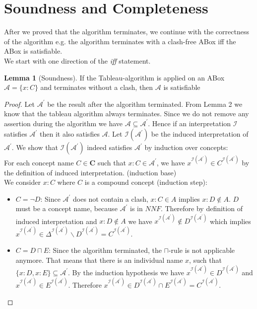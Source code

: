 \documentclass{book}
\theoremstyle{break}
\theoremstyle{definition}
\newtheorem{mylem}{Lemma}
\begin{document}
\section{Soundness and Completeness}
After we proved that the algorithm terminates, we continue with the correctness of the algorithm e.g. the algorithm terminates with a clash-free ABox iff the ABox is satisfiable.\\
We start with one direction of the \textit{iff} statement.
\begin{mylem}[Soundness]
If the Tableau-algorithm is applied on an ABox $\mathcal{A}=\{x:C\}$ and  terminates without a clash, then $\mathcal{A}$ is satisfiable
\end{mylem}
\begin{proof}
Let $\mathcal{A}^\prime$ be the result after the algorithm terminated. From Lemma 2 we know that the tableau algorithm always terminates. Since we do not remove any assertion during the algorithm we have $\mathcal{A}\subseteq\mathcal{A}^\prime$. Hence if an interpretation $\mathcal{I}$ satisfies $\mathcal{A}^\prime$ then it also satisfies $\mathcal{A}$. Let $\mathcal{I}(\mathcal{A}^\prime)$ be the induced interpretation of $\mathcal{A}^\prime$. We show that $\mathcal{I}(\mathcal{A}^\prime)$ indeed satisfies $\mathcal{A}^\prime$ by induction over concepts:\\
For each concept name $C\in\mathbf{C}$ such that $x:C\in\mathcal{A}^\prime$, we have $x^{\mathcal{I}(\mathcal{A}^\prime)}\in C^{\mathcal{I}(\mathcal{A}^\prime)}$ by the definition of induced interpretation. (induction base)\\
We consider $x:C$ where $C$ is a compound concept (induction step):
\begin{itemize}
\item $C=\neg D$: Since $\mathcal{A}^\prime$ does not contain a clash, $x:C\in A$ implies $x:D\notin A$. $D$ must be a concept name, because $\mathcal{A}^\prime$ is in $NNF$. Therefore by definition of induced interpretation and $x:D\notin A$ we have $x^{\mathcal{I}(\mathcal{A}^\prime)}\notin D^{\mathcal{I}(\mathcal{A}^\prime)}$ which implies $x^{\mathcal{I}(\mathcal{A}^\prime)}\in \Delta^{\mathcal{I}(\mathcal{A}^\prime)}\backslash D^{\mathcal{I}(\mathcal{A}^\prime)}=C^{\mathcal{I}(\mathcal{A}^\prime)}$.
\item $C=D\sqcap E$: Since the algorithm terminated, the $\sqcap$-rule is not applicable anymore. That means that there is an individual name $x$, such that $\{x:D, x:E\}\subseteq \mathcal{A}^\prime$. By the induction hypothesis we have $x^{\mathcal{I}(\mathcal{A}^\prime)}\in D^{\mathcal{I}(\mathcal{A}^\prime)}$ and $x^{\mathcal{I}(\mathcal{A}^\prime)}\in E^{\mathcal{I}(\mathcal{A}^\prime)}$. Therefore $x^{\mathcal{I}(\mathcal{A}^\prime)}\in D^{\mathcal{I}(\mathcal{A}^\prime)}\cap E^{\mathcal{I}(\mathcal{A}^\prime)}=C^{\mathcal{I}(\mathcal{A}^\prime)}$.

\end{itemize}
\end{proof}
\end{document}
